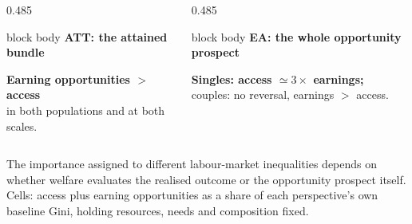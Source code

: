 \documentclass[10pt,aspectratio=169]{beamer}
\renewcommand{\caveat}[1]{{\fontsize{8.2}{10}\selectfont\raggedright\color{deepred}#1\par}}
\begin{document}
\begin{frame}
\vspace{0.2em}
\begin{columns}[T,onlytextwidth]
\begin{column}{0.485\textwidth}
\begin{beamercolorbox}[rounded=true,sep=0.8em]{block body}
{\bfseries ATT: the attained bundle}\par\smallskip
{}
\smallskip
{\color{chearn}\bfseries Earning opportunities $>$ access}\\
in both populations and at both scales.
\end{beamercolorbox}
\end{column}
\begin{column}{0.485\textwidth}
\begin{beamercolorbox}[rounded=true,sep=0.8em]{block body}
{\bfseries EA: the whole opportunity prospect}\par\smallskip
{}
\smallskip
{\color{chacc}\bfseries Singles: access $\simeq 3\times$ earnings;}\\
couples: no reversal, earnings $>$ access.
\end{beamercolorbox}
\end{column}
\end{columns}
\vfill
\caveat{The importance assigned to different labour-market inequalities
depends on whether welfare evaluates the realised outcome or the opportunity
prospect itself. Cells: access plus earning opportunities as a share of each
perspective's own baseline Gini, holding resources, needs and composition fixed.
}
\end{frame}
\end{document}
